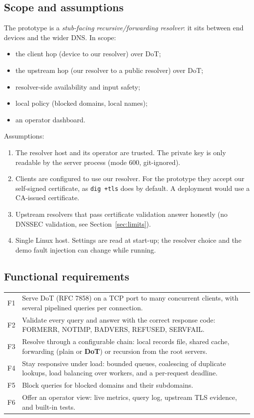 \documentclass[11pt,a4paper]{article}
\newcommand{\code}[1]{\texttt{#1}}
\begin{document}
\subsection{Scope and assumptions}
The prototype is a \emph{stub-facing recursive/forwarding resolver}: it sits between end devices and the
wider DNS. In scope:
\begin{itemize}
  \item the client hop (device to our resolver) over DoT;
  \item the upstream hop (our resolver to a public resolver) over DoT;
  \item resolver-side availability and input safety;
  \item local policy (blocked domains, local names);
  \item an operator dashboard.
\end{itemize}
Assumptions:
\begin{enumerate}[A1.]
  \item The resolver host and its operator are trusted. The private key is only readable by the server
  process (mode 600, git-ignored).
  \item Clients are configured to use our resolver. For the prototype they accept our self-signed certificate,
  as \code{dig +tls} does by default. A deployment would use a CA-issued certificate.
  \item Upstream resolvers that pass certificate validation answer honestly (no DNSSEC validation, see
  Section~\ref{sec:limits}).
  \item Single Linux host. Settings are read at start-up; the resolver choice and the demo fault injection can
  change while running.
\end{enumerate}

\subsection{Functional requirements}
\begin{tabularx}{\textwidth}{@{}lL@{}}
\toprule
F1 & Serve DoT (RFC 7858) on a TCP port to many concurrent clients, with several pipelined queries per connection. \\
F2 & Validate every query and answer with the correct response code: FORMERR, NOTIMP, BADVERS, REFUSED, SERVFAIL. \\
F3 & Resolve through a configurable chain: local records file, shared cache, forwarding (plain or \textbf{DoT}) or recursion from the root servers. \\
F4 & Stay responsive under load: bounded queues, coalescing of duplicate lookups, load balancing over workers, and a per-request deadline. \\
F5 & Block queries for blocked domains and their subdomains. \\
F6 & Offer an operator view: live metrics, query log, upstream TLS evidence, and built-in tests. \\
\bottomrule
\end{tabularx}
\end{document}

